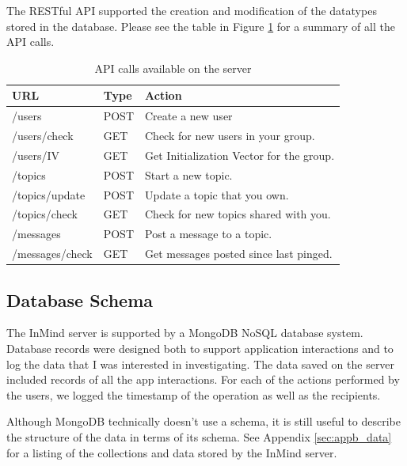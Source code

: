       The RESTful API supported the creation and modification of the datatypes
      stored in the database.
      Please see the table in Figure \ref{fig:api_table} for a summary of all the API calls.

    \renewcommand{\arraystretch}{1.2}
    \begin{table}
    \centering
    \begin{tabular}{  l  l  l }
    \hline
    URL & Type & Action \\ \hline
    /users & POST & Create a new user \\[5pt]
    /users/check & GET & Check for new users in your group. \\[5pt]
    /users/IV & GET & Get Initialization Vector for the group. \\[5pt]
    /topics & POST & Start a new topic. \\[5pt]
    /topics/update & POST & Update a topic that you own. \\[5pt]
    /topics/check & GET & Check for new topics shared with you. \\[5pt]
    /messages & POST & Post a message to a topic. \\[5pt]
    /messages/check & GET & Get messages posted since last pinged. \\[5pt]
    \end{tabular}
    \caption{API calls available on the server}
    \label{fig:api_table}
    \end{table}

    \subsection{Database Schema}
      The InMind server is supported by a MongoDB NoSQL database system.
      Database records were designed both to support application interactions
      and to log the data that I was interested in investigating.
      The data saved on the server included records of all the app interactions.
      For each of the actions performed by the users,
      we logged the timestamp of the operation as well as the recipients.

      Although MongoDB technically doesn't use a schema,
      it is still useful to describe the structure of the data in terms of its schema.
      See Appendix \ref{sec:appb_data} for a listing of the collections and data stored by
      the InMind server.

